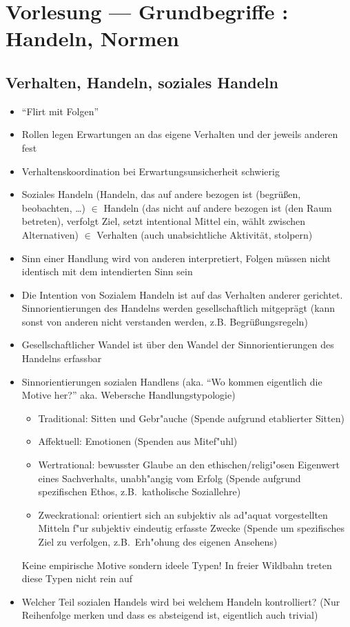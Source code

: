 
\section{Vorlesung  --- Grundbegriffe : Handeln, Normen}
\subsection{Verhalten, Handeln, soziales Handeln}
\begin{itemize}
	\item
		\enquote{Flirt mit Folgen}
	\item
		Rollen legen Erwartungen an das eigene Verhalten und der jeweils anderen fest
	\item
		Verhaltenskoordination bei Erwartungsunsicherheit schwierig
	\item
		Soziales Handeln (Handeln, das auf andere bezogen ist (begrüßen, beobachten, \dots) $\in$ Handeln (das nicht auf andere bezogen ist (den Raum betreten), verfolgt Ziel, setzt intentional Mittel ein, wählt zwischen Alternativen) $\in$ Verhalten (auch unabsichtliche Aktivität, stolpern)
	\item
		Sinn einer Handlung wird von anderen interpretiert, Folgen müssen nicht identisch mit dem intendierten Sinn sein
	\item
		Die Intention von Sozialem Handeln ist auf das Verhalten anderer gerichtet. Sinnorientierungen des Handelns werden gesellschaftlich mitgeprägt (kann sonst von anderen nicht verstanden werden, z.B. Begrüßungsregeln)
	\item
		Gesellschaftlicher Wandel ist über den Wandel der Sinnorientierungen des Handelns erfassbar

	\item
		Sinnorientierungen sozialen Handlens (aka. \enquote{Wo kommen eigentlich die Motive her?} aka. Webersche Handlungstypologie)
		\begin{itemize}
			\item
				Traditional: Sitten und Gebr"auche (Spende aufgrund etablierter Sitten)
			\item
				Affektuell: Emotionen (Spenden aus Mitef"uhl)
			\item
				Wertrational: bewusster Glaube an den ethischen/religi"osen Eigenwert eines Sachverhalts, unabh"angig vom Erfolg (Spende aufgrund spezifischen Ethos, z.B.\ katholische Soziallehre)
			\item
				Zweckrational: orientiert sich an subjektiv als ad"aquat vorgestellten Mitteln f"ur subjektiv eindeutig erfasste Zwecke (Spende um spezifisches Ziel zu verfolgen, z.B.\ Erh"ohung des eigenen Ansehens)
		\end{itemize}
		Keine empirische Motive sondern ideele Typen! In freier Wildbahn treten diese Typen nicht rein auf
	\item
		Welcher Teil sozialen Handels wird bei welchem Handeln kontrolliert? (Nur Reihenfolge merken und dass es absteigend ist, eigentlich auch trivial)


\end{itemize}
